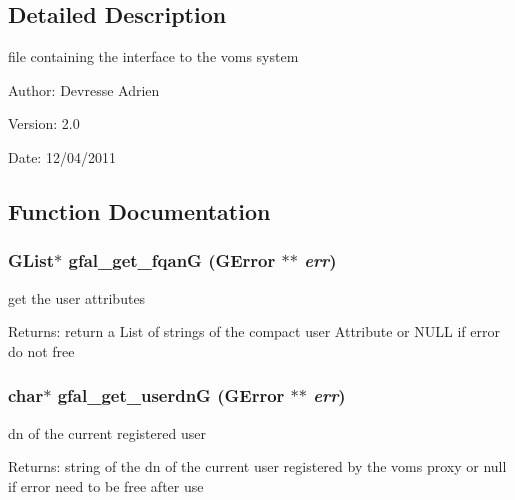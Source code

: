 \subsection{Detailed Description}
file containing the interface to the voms system 

\begin{Desc}
\item[Author:]Devresse Adrien \end{Desc}
\begin{Desc}
\item[Version:]2.0 \end{Desc}
\begin{Desc}
\item[Date:]12/04/2011 \end{Desc}


\subsection{Function Documentation}
\subsubsection{\setlength{\rightskip}{0pt plus 5cm}GList$\ast$ gfal\_\-get\_\-fqan\-G (GError $\ast$$\ast$ {\em err})}\label{gfal__voms__if_8c_9e4e576664ae9bca61727287f4f429bf}


get the user attributes 

\begin{Desc}
\item[Returns:]return a List of strings of the compact user Attribute or NULL if error do not free \end{Desc}
\subsubsection{\setlength{\rightskip}{0pt plus 5cm}char$\ast$ gfal\_\-get\_\-userdn\-G (GError $\ast$$\ast$ {\em err})}\label{gfal__voms__if_8c_50fa65b43095debd77e0cf6fb6645109}


dn of the current registered user 

\begin{Desc}
\item[Returns:]string of the dn of the current user registered by the voms proxy or null if error need to be free after use \end{Desc}
